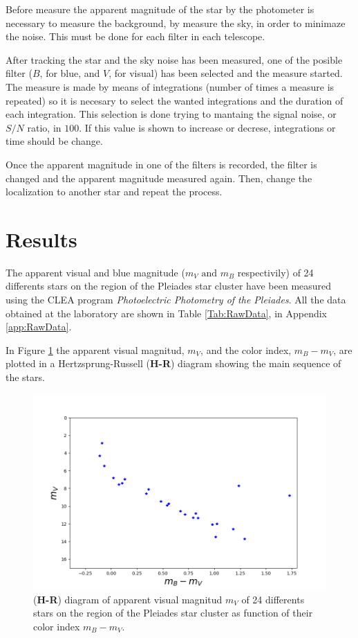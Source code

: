 \documentclass[twoside]{article}
\begin{document}
\begin{multicols}{2}
			Before measure the apparent magnitude of the star by the photometer is necessary to measure the background, by measure the sky, in order to minimaze the noise. This must be done for each filter in each telescope.

			After tracking the star and the sky noise has been measured, one of the posible filter ($B$, for blue, and $V$, for visual) has been selected and the measure started. The measure is made by means of integrations (number of times a measure is repeated) so it is necesary to select the wanted integrations and the duration of each integration. This selection is done trying to mantaing the signal noise, or $S/N$ ratio, in $100$. If this value is shown to increase or decrese, integrations or time should be change.

			Once the apparent magnitude in one of the filters is recorded, the filter is changed and the apparent magnitude measured again. Then, change the localization to another star and repeat the process.

		\section{Results}

			The apparent visual and blue magnitude ($m_V\textrm{ and }m_B$ respectivily) of 24 differents stars on the region of the Pleiades star cluster have been measured using the CLEA program \textit{Photoelectric Photometry of the Pleiades}. All the data obtained at the laboratory are shown in Table \ref{Tab:RawData}, in Appendix \ref{app:RawData}.

			In Figure \ref{Img:Apparent} the apparent visual magnitud, $m_V$, and the color index, $m_B - m_V$, are plotted in a Hertzsprung-Russell (\textbf{H-R}) diagram showing the main sequence of the stars.

				\begin{figure}[H]
					\centering
					\includegraphics[scale=0.35]{Figures/expAparent.png}
					\caption{\label{Img:Apparent}(\textbf{H-R}) diagram of apparent visual magnitud $m_V$ of 24 differents stars on the region of the Pleiades star cluster as function of their color index $m_B - m_V$.}
				\end{figure}


\end{multicols}
\end{document}
